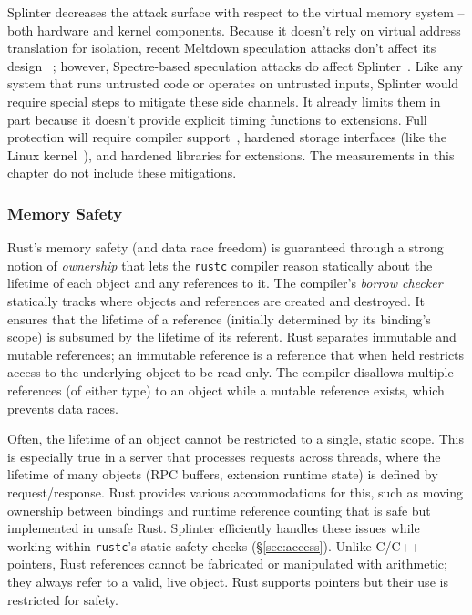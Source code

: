 Splinter decreases the attack surface with respect to the virtual memory system --
    both hardware and kernel components.
Because it doesn't rely on virtual address translation for
    isolation,
    recent Meltdown speculation attacks don't affect its design~\cite{meltdown-2018}%
; however, Spectre-based speculation attacks do affect Splinter~\cite{sbo,spectre-2018}.
Like any system that runs untrusted code or operates on untrusted
  inputs, Splinter would require special steps to mitigate these side channels.
It already limits them in part because it doesn't provide explicit
  timing functions to extensions.
Full protection will require compiler support~\cite{llvm-spectre},
hardened storage interfaces (like
  the Linux kernel~\cite{linux-spectre}), and hardened libraries for
  extensions.
The measurements in this chapter do not include these mitigations.

\subsubsection{Memory Safety}
\label{sec:safety}

Rust's memory safety (and data race freedom) is guaranteed through a strong notion
  of \textsl{ownership} that lets the \texttt{rustc} compiler reason statically
  about the lifetime of each object and any references to it.
The compiler's \textsl{borrow checker} statically tracks where objects and
  references are created and destroyed.
It ensures that the lifetime of a reference (initially determined by its binding's scope)
  is subsumed by the lifetime of its referent.
Rust separates immutable and mutable references; an immutable reference is a
  reference that when held restricts access to the underlying object to be read-only.
The compiler disallows multiple references (of either type) to
  an object while a mutable reference exists, which prevents data races.

Often, the lifetime of an object cannot be restricted to a single, static scope.
This is especially true in a server that processes requests across threads,
  where the lifetime of many objects (RPC buffers, extension runtime
  state) is defined by request/response.
Rust provides various accommodations for this, such as moving ownership between
  bindings and runtime reference counting that is safe but implemented in unsafe Rust.
Splinter efficiently handles these issues while working within
\texttt{rustc}'s static safety checks (\S\ref{sec:access}).
Unlike C/C++ pointers, Rust references cannot be fabricated or manipulated with
  arithmetic; they always refer to a valid, live object.
Rust supports pointers but their use is restricted for safety.

